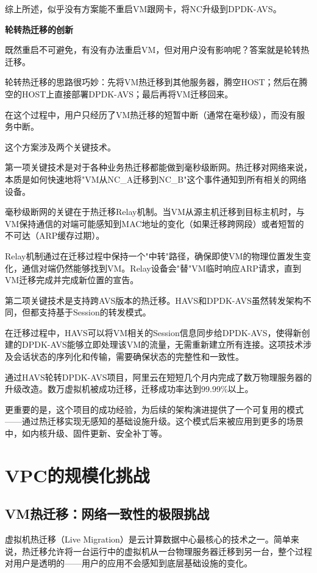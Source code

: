 综上所述，似乎没有方案能不重启VM跟网卡，将NC升级到DPDK-AVS。

\textbf{轮转热迁移的创新}

既然重启不可避免，有没有办法重启VM，但对用户没有影响呢？答案就是轮转热迁移。

轮转热迁移的思路很巧妙：先将VM热迁移到其他服务器，腾空HOST；然后在腾空的HOST上直接部署DPDK-AVS；最后再将VM迁移回来。

在这个过程中，用户只经历了VM热迁移的短暂中断（通常在毫秒级），而没有服务中断。

这个方案涉及两个关键技术。

第一项关键技术是对于各种业务热迁移都能做到毫秒级断网。热迁移对网络来说，本质是如何快速地将"VM从NC_A迁移到NC_B"这个事件通知到所有相关的网络设备。

毫秒级断网的关键在于热迁移Relay机制。当VM从源主机迁移到目标主机时，与VM保持通信的对端可能感知到MAC地址的变化（如果迁移跨网段）或者短暂的不可达（ARP缓存过期）。

Relay机制通过在迁移过程中保持一个"中转"路径，确保即使VM的物理位置发生变化，通信对端仍然能够找到VM。Relay设备会"替"VM临时响应ARP请求，直到VM迁移完成并完成新位置的宣告。

第二项关键技术是支持跨AVS版本的热迁移。HAVS和DPDK-AVS虽然转发架构不同，但都支持基于Session的转发模式。

在迁移过程中，HAVS可以将VM相关的Session信息同步给DPDK-AVS，使得新创建的DPDK-AVS能够立即处理该VM的流量，无需重新建立所有连接。这项技术涉及会话状态的序列化和传输，需要确保状态的完整性和一致性。

通过HAVS轮转DPDK-AVS项目，阿里云在短短几个月内完成了数万物理服务器的升级改造。数万虚拟机被成功迁移，迁移成功率达到99.99\%以上。

更重要的是，这个项目的成功经验，为后续的架构演进提供了一个可复用的模式——通过热迁移实现无感知的基础设施升级。这个模式后来被应用到更多的场景中，如内核升级、固件更新、安全补丁等。

\section{VPC的规模化挑战}

\subsection{VM热迁移：网络一致性的极限挑战}

虚拟机热迁移（Live Migration）是云计算数据中心最核心的技术之一。简单来说，热迁移允许将一台运行中的虚拟机从一台物理服务器迁移到另一台，整个过程对用户是透明的——用户的应用不会感知到底层基础设施的变化。

